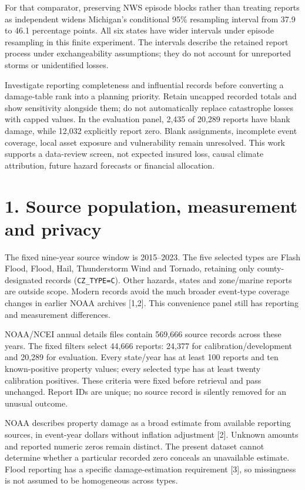 \documentclass[11pt,letterpaper]{article}
\begin{document}
For that comparator, preserving NWS episode blocks rather than treating reports as independent widens Michigan's conditional 95\% resampling interval from 37.9 to 46.1 percentage points. All six states have wider intervals under episode resampling in this finite experiment. The intervals describe the retained report process under exchangeability assumptions; they do not account for unreported storms or unidentified losses.

Investigate reporting completeness and influential records before converting a damage-table rank into a planning priority. Retain uncapped recorded totals and show sensitivity alongside them; do not automatically replace catastrophe losses with capped values. In the evaluation panel, 2,435 of 20,289 reports have blank damage, while 12,032 explicitly report zero. Blank assignments, incomplete event coverage, local asset exposure and vulnerability remain unresolved. This work supports a data-review screen, not expected insured loss, causal climate attribution, future hazard forecasts or financial allocation.

\newpage
\section*{1. Source population, measurement and privacy}
The fixed nine-year source window is 2015--2023. The five selected types are Flash Flood, Flood, Hail, Thunderstorm Wind and Tornado, retaining only county-designated records (\texttt{CZ\_TYPE=C}). Other hazards, states and zone/marine reports are outside scope. Modern records avoid the much broader event-type coverage changes in earlier NOAA archives [1,2]. This convenience panel still has reporting and measurement differences.

NOAA/NCEI annual details files contain 569,666 source records across these years. The fixed filters select 44,666 reports: 24,377 for calibration/development and 20,289 for evaluation. Every state/year has at least 100 reports and ten known-positive property values; every selected type has at least twenty calibration positives. These criteria were fixed before retrieval and pass unchanged. Report IDs are unique; no source record is silently removed for an unusual outcome.

NOAA describes property damage as a broad estimate from available reporting sources, in event-year dollars without inflation adjustment [2]. Unknown amounts and reported numeric zeros remain distinct. The present dataset cannot determine whether a particular recorded zero conceals an unavailable estimate. Flood reporting has a specific damage-estimation requirement [3], so missingness is not assumed to be homogeneous across types.
\end{document}
